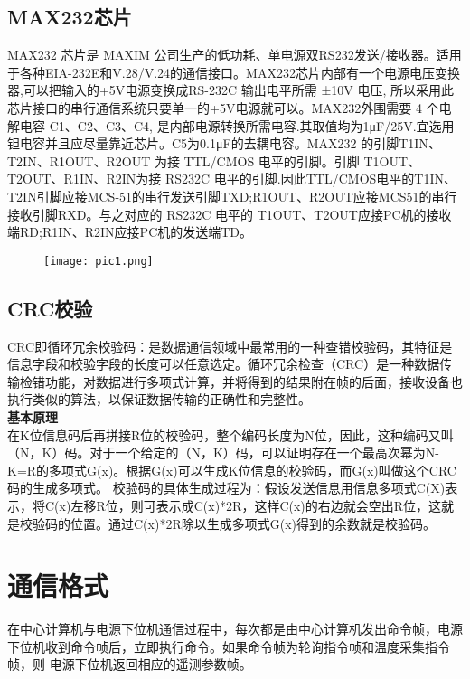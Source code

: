\documentclass{article}
\begin{document}
\subsection{MAX232芯片}
\noindent MAX232 芯片是 MAXIM 公司生产的低功耗、单电源双RS232发送/接收器。适用于各种EIA-232E和V.28/V.24的通信接口。MAX232芯片内部有一个电源电压变换器,可以把输入的+5V电源变换成RS-232C 输出电平所需 ±10V 电压, 所以采用此芯片接口的串行通信系统只要单一的+5V电源就可以。MAX232外围需要 4 个电解电容 C1、C2、C3、C4, 是内部电源转换所需电容.其取值均为1μF/25V.宜选用钽电容并且应尽量靠近芯片。C5为0.1μF的去耦电容。MAX232 的引脚T1IN、T2IN、R1OUT、R2OUT 为接 TTL/CMOS 电平的引脚。引脚 T1OUT、T2OUT、R1IN、R2IN为接 RS232C 电平的引脚.因此TTL/CMOS电平的T1IN、T2IN引脚应接MCS-51的串行发送引脚TXD;R1OUT、R2OUT应接MCS51的串行接收引脚RXD。与之对应的 RS232C 电平的 T1OUT、T2OUT应接PC机的接收端RD;R1IN、R2IN应接PC机的发送端TD。\\

\begin{figure}[ht]
\centering
\texttt{[image: pic1.png]}
\label{fig:label}
\end{figure}

\par

\subsection{CRC校验}
\noindent CRC即循环冗余校验码：是数据通信领域中最常用的一种查错校验码，其特征是信息字段和校验字段的长度可以任意选定。循环冗余检查（CRC）是一种数据传输检错功能，对数据进行多项式计算，并将得到的结果附在帧的后面，接收设备也执行类似的算法，以保证数据传输的正确性和完整性。 \\
\textbf{基本原理} \\
在K位信息码后再拼接R位的校验码，整个编码长度为N位，因此，这种编码又叫（N，K）码。对于一个给定的（N，K）码，可以证明存在一个最高次幂为N-K=R的多项式G(x)。根据G(x)可以生成K位信息的校验码，而G(x)叫做这个CRC码的生成多项式。
校验码的具体生成过程为：假设发送信息用信息多项式C(X)表示，将C(x)左移R位，则可表示成C(x)*2R，这样C(x)的右边就会空出R位，这就是校验码的位置。通过C(x)*2R除以生成多项式G(x)得到的余数就是校验码。


\section{通信格式}
\noindent 在中心计算机与电源下位机通信过程中，每次都是由中心计算机发出命令帧，电源
下位机收到命令帧后，立即执行命令。如果命令帧为轮询指令帧和温度采集指令帧，则
电源下位机返回相应的遥测参数帧。
\end{document}
